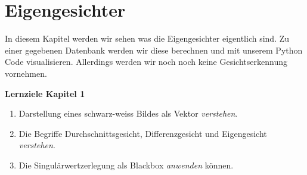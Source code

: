 \section{Eigengesichter}
In diesem Kapitel werden wir sehen was die Eigengesichter eigentlich sind.
Zu einer gegebenen Datenbank werden wir diese berechnen und mit unserem Python Code visualisieren.
Allerdings werden wir noch noch keine Gesichtserkennung vornehmen.
\begin{tcolorbox}
	\centerline{\textbf{Lernziele Kapitel 1}}
	\begin{enumerate}[leftmargin=*]
		\item Darstellung eines schwarz-weiss Bildes als Vektor \textit{verstehen}.
		\item Die Begriffe Durchschnittsgesicht, Differenzgesicht und Eigengesicht \textit{verstehen}.
		\item Die Singulärwertzerlegung als Blackbox \textit{anwenden} können.
	\end{enumerate}
\end{tcolorbox}